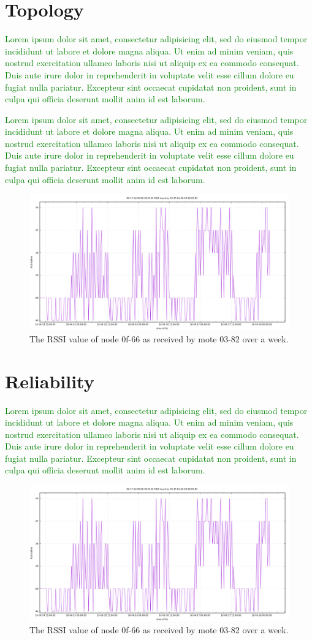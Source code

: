 \documentclass{sig-alternate}
\newcommand{\lorem}               {\textcolor{green}{Lorem ipsum dolor sit amet, consectetur adipisicing elit, sed do eiusmod tempor incididunt ut labore et dolore magna aliqua. Ut enim ad minim veniam, quis nostrud exercitation ullamco laboris nisi ut aliquip ex ea commodo consequat. Duis aute irure dolor in reprehenderit in voluptate velit esse cillum dolore eu fugiat nulla pariatur. Excepteur sint occaecat cupidatat non proident, sunt in culpa qui officia deserunt mollit anim id est laborum.}}
\begin{document}
\section{Topology}
\label{sec:topology}


\lorem


\lorem

\begin{figure}
    \centering
    \includegraphics[width=\columnwidth]{periodic_rssi}
    \caption{The RSSI value of node 0f-66 as received by mote 03-82 over a week.}
    \label{fig:topology}
\end{figure}

\section{Reliability}
\label{sec:reliability}


\lorem

\begin{figure}
    \centering
    \includegraphics[width=\columnwidth]{periodic_rssi}
    \caption{The RSSI value of node 0f-66 as received by mote 03-82 over a week.}
    \label{fig:reliability}
\end{figure}
\end{document}

